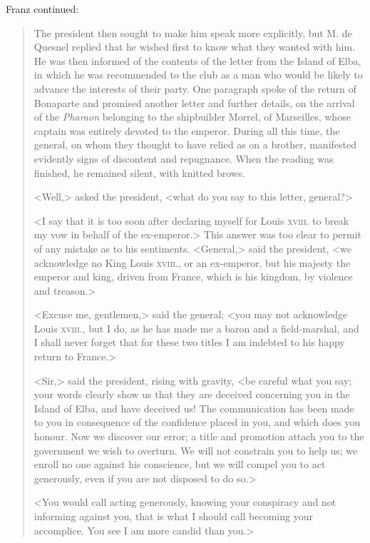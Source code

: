  Franz continued: 
\begin{quotation}
The president then sought to make him speak more explicitly, but M. de Quesnel replied that he wished first to know what they wanted with him. He was then informed of the contents of the letter from the Island of Elba, in which he was recommended to the club as a man who would be likely to advance the interests of their party. One paragraph spoke of the return of Bonaparte and promised another letter and further details, on the arrival of the \textit{Pharaon} belonging to the shipbuilder Morrel, of Marseilles, whose captain was entirely devoted to the emperor. During all this time, the general, on whom they thought to have relied as on a brother, manifested evidently signs of discontent and repugnance. When the reading was finished, he remained silent, with knitted brows. 

<Well,> asked the president, <what do you say to this letter, general?> 

<I say that it is too soon after declaring myself for Louis \textsc{xviii.} to break my vow in behalf of the ex-emperor.> This answer was too clear to permit of any mistake as to his sentiments. <General,> said the president, <we acknowledge no King Louis \textsc{xviii.}, or an ex-emperor, but his majesty the emperor and king, driven from France, which is his kingdom, by violence and treason.> 

<Excuse me, gentlemen,> said the general; <you may not acknowledge Louis \textsc{xviii.}, but I do, as he has made me a baron and a field-marshal, and I shall never forget that for these two titles I am indebted to his happy return to France.> 

<Sir,> said the president, rising with gravity, <be careful what you say; your words clearly show us that they are deceived concerning you in the Island of Elba, and have deceived us! The communication has been made to you in consequence of the confidence placed in you, and which does you honour. Now we discover our error; a title and promotion attach you to the government we wish to overturn. We will not constrain you to help us; we enroll no one against his conscience, but we will compel you to act generously, even if you are not disposed to do so.> 

<You would call acting generously, knowing your conspiracy and not informing against you, that is what I should call becoming your accomplice. You see I am more candid than you.>
\end{quotation}


